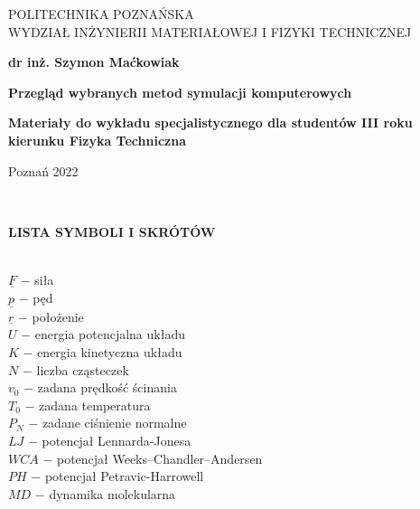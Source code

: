 \documentclass[12pt,a4paper,openright]{report} %
\begin{document}
%
%
\thispagestyle{empty}
\begin{center}
\large{POLITECHNIKA POZNAŃSKA \\
WYDZIAŁ INŻYNIERII MATERIAŁOWEJ I FIZYKI TECHNICZNEJ}
\end{center}

\vspace{1cm}
\begin{center}
\large{\textbf{dr inż. Szymon Maćkowiak}} \\
\end{center}

\vspace{2cm}

\begin{center}
\huge{\textbf{Przegląd wybranych metod symulacji komputerowych}}
\end{center}

\vspace{2cm}

\begin{center}
\large{\textbf{Materiały do wykładu specjalistycznego dla studentów III roku kierunku Fizyka Techniczna}}
\end{center}

\vspace{2cm}



\vspace{4cm}

\begin{center}
\large{Poznań 2022}
\end{center}
\newpage
%
%
\clearpage\thispagestyle{empty}
~

%
\clearpage\thispagestyle{empty}
\textbf{LISTA SYMBOLI I SKRÓTÓW} \\
\\
\begin{spacing}{1.2}
\noindent
$\underline{F}$ $-$ siła\\
$\underline{p}$ $-$ pęd\\
$\underline{r}$ $-$ położenie\\
$U$ $-$ energia potencjalna układu\\
$K$ $-$ energia kinetyczna układu\\
$N$ $-$ liczba cząsteczek\\
$v_0$ $-$ zadana prędkość ścinania\\
$T_0$ $-$ zadana temperatura\\
$P_N$ $-$ zadane ciśnienie normalne\\
$LJ$ $-$ potencjał Lennarda-Jonesa\\
$WCA$ $-$ potencjał Weeks–Chandler–Andersen\\
$PH$ $-$ potencjał Petravic-Harrowell\\
$MD$ $-$ dynamika molekularna\\

\end{spacing}
\end{document}
